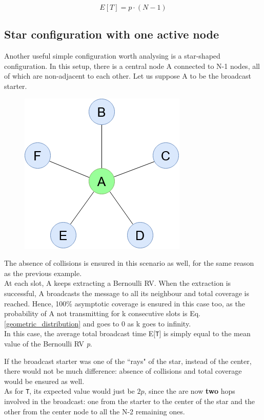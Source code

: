 \begin{equation}
	E[T] = p \cdot (N-1)
	\label{singleQueueMeanT}
\end{equation}

\subsection{Star configuration with one active node}
Another useful simple configuration worth analysing is a star-shaped configuration. In this setup, there is a central node A connected to N-1 nodes, all of which are non-adjacent to each other. Let us suppose A to be the broadcast starter.

\begin{figure}[H]%
    \centering
	{{\includegraphics[scale=0.5]{img/star_graph.png} }}%
    \caption{}%
    \label{fig:star_graph}%
\end{figure}

The absence of collisions is ensured in this scenario as well, for the same reason as the previous example.\\
At each slot, A keeps extracting a Bernoulli RV. When the extraction is successful, A broadcasts the message to all its neighbour and total coverage is reached. Hence, 100\% asymptotic coverage is ensured in this case too, as the probability of A not transmitting for k consecutive slots is Eq. \ref{geometric_distribution} and goes to 0 as k goes to infinity.\\
In this case, the average total broadcast time E[\texttt{T}] is simply equal to the mean value of the Bernoulli RV \textit{p}.

If the broadcast starter was one of the ``rays" of the star, instead of the center, there would not be much difference: absence of collisions and total coverage would be ensured as well.\\
As for \texttt{T}, its expected value would just be $2p$, since the are now \textbf{two} hops involved in the broadcast: one from the starter to the center of the star and the other from the center node to all the N-2 remaining ones.


